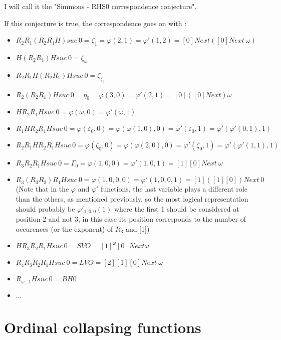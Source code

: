 \documentclass[10pt]{article}
\begin{document}
I will call it the "Simmons - RHS0 correspondence conjecture".

If this conjecture is true, the correspondence goes on with : 

\begin{itemize}
     \setlength{\itemsep}{1pt}
     \setlength{\parskip}{0pt}
     \setlength{\parsep}{0pt}

\item \( R_2 R_1 (R_2 R_1 H) suc\ 0 = \zeta_1 = \varphi(2,1) = \varphi'(1,2) = [0] Next ([0] Next\ \omega) \)
\item \( H (R_2 R_1) H suc\ 0 = \zeta_\omega \)
\item \( R_2 R_1 H (R_2 R_1) H suc\ 0 = \zeta_{\zeta_0} \)
\item \( R_2 (R_2 R_1) H suc\ 0 = \eta_0 = \varphi(3,0) = \varphi'(2,1) = [0] ([0] Next) \omega \)
\item \( H R_2 R_1 H suc\ 0 = \varphi(\omega,0) = \varphi'(\omega,1) \)
\item \( R_1 H R_2 R_1 H suc\ 0 = \varphi(\varepsilon_0,0) = \varphi(\varphi(1,0),0) = \varphi'(\varepsilon_0,1) = \varphi'(\varphi'(0,1),1) \)
\item \( R_2 R_1 H R_2 R_1 H suc\ 0 = \varphi(\zeta_0,0) = \varphi(\varphi(2,0),0) = \varphi'(\zeta_0,1) = \varphi'(\varphi'(1,1),1) \)
\item \( R_3 R_2 R_1 H suc\ 0 = \Gamma_0 = \varphi(1,0,0) = \varphi'(1,0,1) = [1] [0] Next\ \omega \)
\item \( R_3 (R_3 R_2) R_1 H suc\ 0 = \varphi(1,0,0,0) = \varphi'(1,0,0,1) = [1] ([1] [0]) Next\ 0 \) (Note that in the \( \varphi \) and \( \varphi' \) functions, the last variable plays a different role than the others, as mentioned previously, so the most logical representation should probably be \( \varphi'_{1,0,0}(1) \) where the first 1 should be considered at position 2 and not 3, in this case its position corresponds to the number of occurences (or the exponent) of \( R_3 \) and [1])
\item \( H R_3 R_2 R_1 H suc\ 0 = SVO = [1]^\omega [0] Next \omega \)
\item \( R_4 R_3 R_2 R_1 H suc\ 0 = LVO = [2] [1] [0] Next\ \omega \)
\item \( R_{\omega \ldots 1} H suc\ 0 = BH0 \)

\item \( \ldots \)
\end{itemize}



\section{Ordinal collapsing functions}
\end{document}
